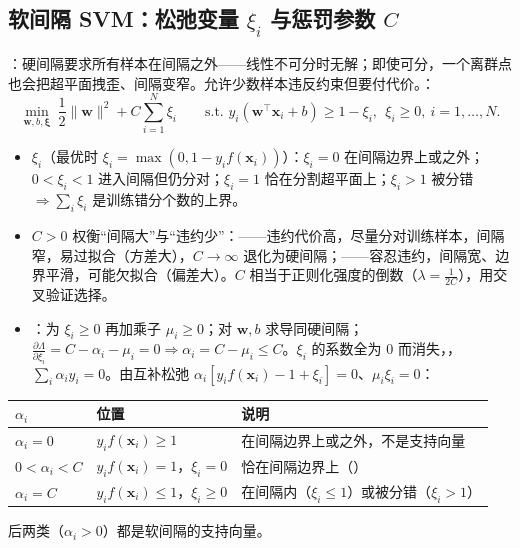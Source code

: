 \subsection{软间隔 SVM：松弛变量 \texorpdfstring{$\xi_i$}{xi} 与惩罚参数 \texorpdfstring{$C$}{C} \tagext}
：硬间隔要求所有样本在间隔之外——线性不可分时无解；即使可分，一个离群点也会把超平面拽歪、间隔变窄。允许少数样本违反约束但要付代价。：
\[
\min_{\bm w,b,\bm\xi}\ \frac12\|\bm w\|^2+C\sum_{i=1}^N\xi_i\qquad\text{s.t. }y_i(\bm w^\top\bm x_i+b)\ge1-\xi_i,\ \ \xi_i\ge0,\ i=1,\dots,N.
\]
\begin{itemize}
\item {} $\xi_i$（最优时 $\xi_i=\max(0,1-y_if(\bm x_i))$）：$\xi_i=0$ 在间隔边界上或之外；$0<\xi_i<1$ 进入间隔但仍分对；$\xi_i=1$ 恰在分割超平面上；$\xi_i>1$ 被分错 $\Rightarrow\sum_i\xi_i$ 是训练错分个数的上界。
\item {} $C>0$ 权衡“间隔大”与“违约少”：——违约代价高，尽量分对训练样本，间隔窄，易过拟合（方差大），$C\to\infty$ 退化为硬间隔；——容忍违约，间隔宽、边界平滑，可能欠拟合（偏差大）。$C$ 相当于正则化强度的倒数（$\lambda=\frac1{2C}$），用交叉验证选择。
\item {}：为 $\xi_i\ge0$ 再加乘子 $\mu_i\ge0$；对 $\bm w,b$ 求导同硬间隔；$\frac{\partial\Lambda}{\partial\xi_i}=C-\alpha_i-\mu_i=0\Rightarrow\alpha_i=C-\mu_i\le C$。$\xi_i$ 的系数全为 0 而消失，，$\sum_i\alpha_iy_i=0$。由互补松弛 $\alpha_i[y_if(\bm x_i)-1+\xi_i]=0$、$\mu_i\xi_i=0$：
\end{itemize}
\begin{center}\small
\begin{tabularx}{\linewidth}{@{}p{2.3cm}p{4.2cm}L@{}}
\toprule
$\alpha_i$ & 位置 & 说明 \\
\midrule
$\alpha_i=0$ & $y_if(\bm x_i)\ge1$ & 在间隔边界上或之外，不是支持向量 \\
$0<\alpha_i<C$ & $y_if(\bm x_i)=1$，$\xi_i=0$ & 恰在间隔边界上（） \\
$\alpha_i=C$ & $y_if(\bm x_i)\le1$，$\xi_i\ge0$ & 在间隔内（$\xi_i\le1$）或被分错（$\xi_i>1$） \\
\bottomrule
\end{tabularx}
\end{center}
后两类（$\alpha_i>0$）都是软间隔的支持向量。

